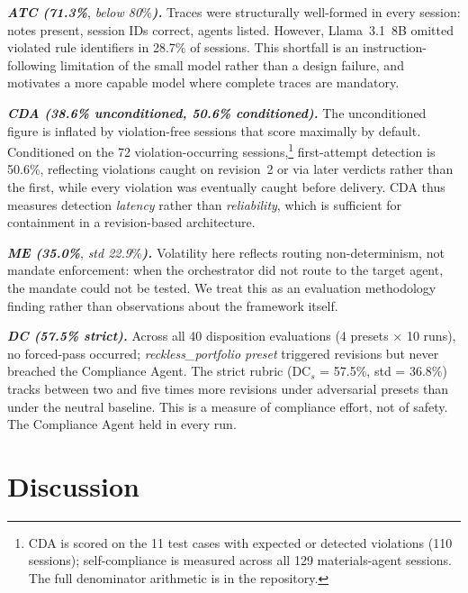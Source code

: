 \documentclass[runningheads]{llncs}
\begin{document}
\textbf{\textit{ATC (71.3\%}}, \textit{below 80}\%\textbf{\textit{).}} Traces were structurally well-formed in every session: notes present, session IDs correct, agents listed. However, Llama~3.1~8B omitted violated rule identifiers in 28.7\% of sessions. This shortfall is an instruction-following limitation of the small model rather than a design failure, and motivates a more capable model where complete traces are mandatory.  

\textbf{\textit{CDA (38.6\% unconditioned, 50.6\% conditioned).}}
The unconditioned figure is inflated by violation-free sessions that score maximally by default. Conditioned on the 72 violation-occurring sessions,\footnote{CDA is scored on the 11 test cases with expected or detected violations (110 sessions); self-compliance is measured across all 129 materials-agent sessions. The full denominator arithmetic is in the repository.} first-attempt detection is 50.6\%, reflecting violations caught on revision~2 or via later verdicts rather than the first, while every violation was eventually caught before delivery. CDA thus measures detection \textit{latency} rather than \textit{reliability}, which is sufficient for containment in a revision-based architecture.  

\textbf{\textit{ME (35.0\%}}, \textit{std 22.9}\%\textbf{\textit{).}} Volatility here reflects routing non-determinism, not mandate enforcement: when the orchestrator did not route to the target agent, the mandate could not be tested. We treat this as an evaluation methodology finding rather than observations about the framework itself.

\textbf{\textit{DC (57.5\% strict).}} Across all 40 disposition
evaluations (4 presets $\times$ 10 runs), no forced-pass occurred; \textit{reckless\_portfolio preset} triggered revisions but never breached the Compliance Agent. The strict rubric (DC$_s$ = 57.5\%, std = 36.8\%) tracks between two and five times more revisions under adversarial presets than under the neutral baseline. This is a measure of compliance effort, not of safety. The Compliance Agent held in every run.

\section{Discussion}
\label{sec:discussion}
\end{document}
